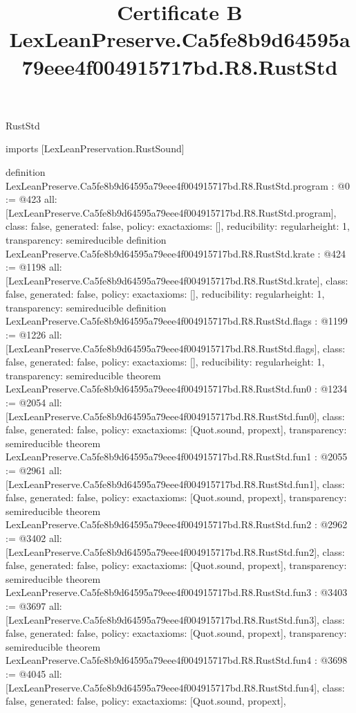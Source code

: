 \begin{lexlean}{RustStd}
\title{Certificate B LexLeanPreserve.Ca5fe8b9d64595a79eee4f004915717bd.R8.RustStd}
\begin{coremodule}
imports [LexLeanPreservation.RustSound]

definition LexLeanPreserve.Ca5fe8b9d64595a79eee4f004915717bd.R8.RustStd.program : @0 := @423 {
  all: [LexLeanPreserve.Ca5fe8b9d64595a79eee4f004915717bd.R8.RustStd.program],
  class: false,
  generated: false,
  policy: exact{axioms: []},
  reducibility: regular{height: 1},
  transparency: semireducible
}
definition LexLeanPreserve.Ca5fe8b9d64595a79eee4f004915717bd.R8.RustStd.krate : @424 := @1198 {
  all: [LexLeanPreserve.Ca5fe8b9d64595a79eee4f004915717bd.R8.RustStd.krate],
  class: false,
  generated: false,
  policy: exact{axioms: []},
  reducibility: regular{height: 1},
  transparency: semireducible
}
definition LexLeanPreserve.Ca5fe8b9d64595a79eee4f004915717bd.R8.RustStd.flags : @1199 := @1226 {
  all: [LexLeanPreserve.Ca5fe8b9d64595a79eee4f004915717bd.R8.RustStd.flags],
  class: false,
  generated: false,
  policy: exact{axioms: []},
  reducibility: regular{height: 1},
  transparency: semireducible
}
theorem LexLeanPreserve.Ca5fe8b9d64595a79eee4f004915717bd.R8.RustStd.fun0 : @1234 := @2054 {
  all: [LexLeanPreserve.Ca5fe8b9d64595a79eee4f004915717bd.R8.RustStd.fun0],
  class: false,
  generated: false,
  policy: exact{axioms: [Quot.sound, propext]},
  transparency: semireducible
}
theorem LexLeanPreserve.Ca5fe8b9d64595a79eee4f004915717bd.R8.RustStd.fun1 : @2055 := @2961 {
  all: [LexLeanPreserve.Ca5fe8b9d64595a79eee4f004915717bd.R8.RustStd.fun1],
  class: false,
  generated: false,
  policy: exact{axioms: [Quot.sound, propext]},
  transparency: semireducible
}
theorem LexLeanPreserve.Ca5fe8b9d64595a79eee4f004915717bd.R8.RustStd.fun2 : @2962 := @3402 {
  all: [LexLeanPreserve.Ca5fe8b9d64595a79eee4f004915717bd.R8.RustStd.fun2],
  class: false,
  generated: false,
  policy: exact{axioms: [Quot.sound, propext]},
  transparency: semireducible
}
theorem LexLeanPreserve.Ca5fe8b9d64595a79eee4f004915717bd.R8.RustStd.fun3 : @3403 := @3697 {
  all: [LexLeanPreserve.Ca5fe8b9d64595a79eee4f004915717bd.R8.RustStd.fun3],
  class: false,
  generated: false,
  policy: exact{axioms: [Quot.sound, propext]},
  transparency: semireducible
}
theorem LexLeanPreserve.Ca5fe8b9d64595a79eee4f004915717bd.R8.RustStd.fun4 : @3698 := @4045 {
  all: [LexLeanPreserve.Ca5fe8b9d64595a79eee4f004915717bd.R8.RustStd.fun4],
  class: false,
  generated: false,
  policy: exact{axioms: [Quot.sound, propext]},
}
\end{coremodule}
\end{lexlean}
